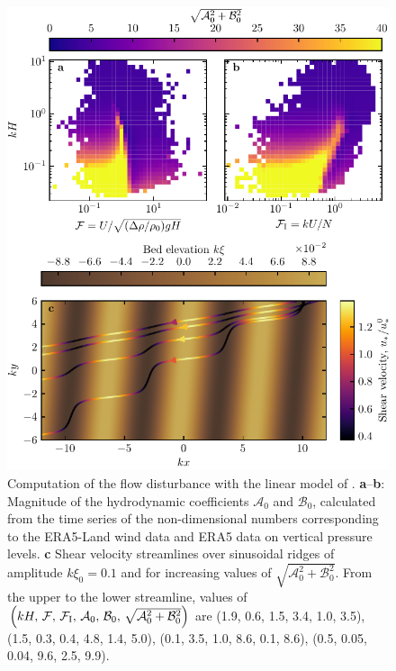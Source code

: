 \begin{figure}[p]
\centering
\includegraphics[scale=1]{Figures/Figure13_supp.pdf}
\caption{Computation of the flow disturbance with the linear model of \citet{Andreotti2009}. \textbf{a}--\textbf{b}: Magnitude of the hydrodynamic coefficients $\mathcal{A}_0$ and $\mathcal{B}_0$, calculated from the time series of the non-dimensional numbers corresponding to the ERA5-Land wind data and ERA5 data on vertical pressure levels. \textbf{c} Shear velocity streamlines over sinusoidal ridges of amplitude $k\xi_0 = 0.1$ and for increasing values of $\sqrt{\mathcal{A}_{0}^{2} + \mathcal{B}_{0}^{2}}$. From the upper to the lower streamline, values of $\left(kH,\, \mathcal{F},\, \mathcal{F}_{\rm I},\, \mathcal{A}_{0},\, \mathcal{B}_{0},\, \sqrt{\mathcal{A}_{0}^{2} + \mathcal{B}_{0}^{2}}\right)$ are (1.9, 0.6, 1.5, 3.4, 1.0, 3.5), (1.5, 0.3, 0.4, 4.8, 1.4, 5.0), (0.1, 3.5, 1.0, 8.6, 0.1, 8.6), (0.5, 0.05, 0.04, 9.6, 2.5, 9.9).}
\label{Fig13_supp}
\end{figure}

